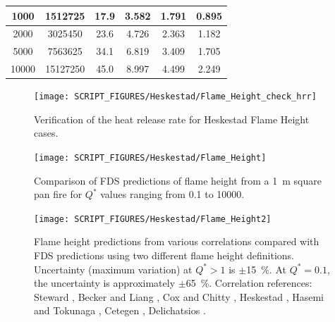 \begin{table}[h!]
\begin{center}
\begin{tabular}{|c|c|c|c|c|c|}
1000        &   1512725      & 17.9       & 3.582        & 1.791       &  0.895     \\ \hline
2000        &   3025450      & 23.6       & 4.726        & 2.363       &  1.182     \\ \hline
5000        &   7563625      & 34.1       & 6.819        & 3.409       &  1.705     \\ \hline
10000       &   15127250     & 45.0       & 8.997        & 4.499       &  2.249     \\ \hline
\end{tabular}
\end{center}
\label{Flame_Height_Parameters}
\end{table}

\begin{figure}[!h]
\begin{center}
\texttt{[image: SCRIPT\_FIGURES/Heskestad/Flame\_Height\_check\_hrr]}
\end{center}
\caption[Verification of the heat release rate for Heskestad Flame Height cases]
{Verification of the heat release rate for Heskestad Flame Height cases.}
\label{Flame_Height_check_hrr}
\end{figure}

\clearpage

\begin{figure}[!h]
\begin{center}
\texttt{[image: SCRIPT\_FIGURES/Heskestad/Flame\_Height]}
\end{center}
\caption[Summary of flame height predictions, Heskestad correlation]
{Comparison of FDS predictions of flame height from a 1~m square pan fire for $Q^*$ values ranging from
0.1 to 10000.}
\label{Flame_Height}
\end{figure}

\begin{figure}[!h]
\texttt{[image: SCRIPT\_FIGURES/Heskestad/Flame\_Height2]}
\caption[Flame height uncertainty, multiple correlations and flame height definitions]
{Flame height predictions from various correlations compared with FDS predictions using two different flame height definitions.  Uncertainty (maximum variation) at $Q^*>1$ is $\pm$15~\%.  At $Q^*=0.1$, the uncertainty is approximately $\pm$65~\%. Correlation references: Steward \cite{Steward:1970}, Becker and Liang \cite{Becker:1978}, Cox and Chitty \cite{Cox:1985}, Heskestad \cite{SFPE:Heskestad}, Hasemi and Tokunaga \cite{Hasemi:1984}, Cetegen \cite{Cetegen:1984}, Delichatsios \cite{Delichatsios:1984}.}
\label{Flame_Height2}
\end{figure}



